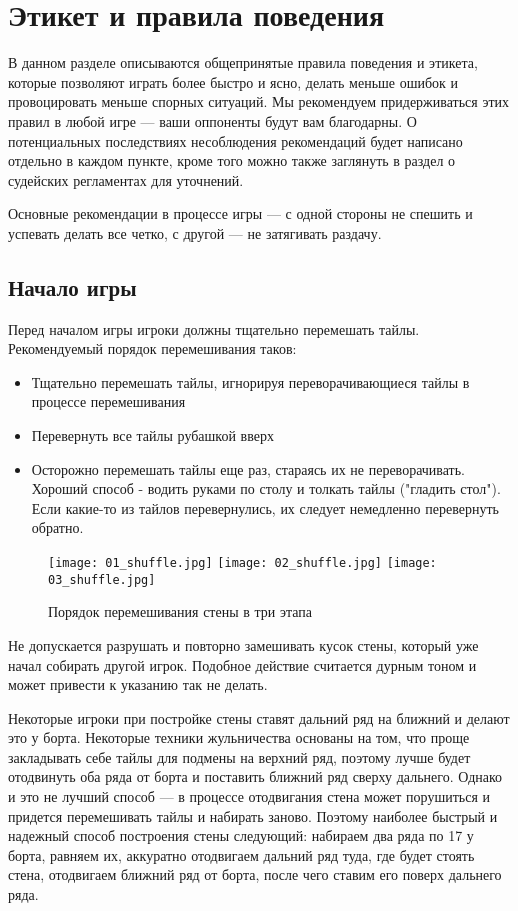 \section{Этикет и правила поведения}

В данном разделе описываются общепринятые правила поведения и этикета, которые позволяют играть более быстро и ясно, делать меньше ошибок и провоцировать меньше спорных ситуаций. Мы рекомендуем придерживаться этих правил в любой игре --- ваши оппоненты будут вам благодарны. О потенциальных последствиях несоблюдения рекомендаций будет написано отдельно в каждом пункте, кроме того можно также заглянуть в раздел о судейских регламентах для уточнений.

Основные рекомендации в процессе игры --- с одной стороны не спешить и успевать делать все четко, с другой --- не затягивать раздачу. 

\subsection {Начало игры}

Перед началом игры игроки должны тщательно перемешать тайлы. Рекомендуемый порядок перемешивания таков:

\begin{itemize}
	\item Тщательно перемешать тайлы, игнорируя переворачивающиеся тайлы в процессе перемешивания
	\item Перевернуть все тайлы рубашкой вверх
	\item Осторожно перемешать тайлы еще раз, стараясь их не переворачивать. Хороший способ - водить руками по столу и толкать тайлы ("гладить стол"). Если какие-то из тайлов перевернулись, их следует немедленно перевернуть обратно.
\end{itemize}

\begin{figure}[H]
	\centering
	\texttt{[image: 01\_shuffle.jpg]}
	\texttt{[image: 02\_shuffle.jpg]}
	\texttt{[image: 03\_shuffle.jpg]}
	\caption{Порядок перемешивания стены в три этапа}
\end{figure}

Не допускается разрушать и повторно замешивать кусок стены, который уже начал собирать другой игрок. Подобное действие считается дурным тоном и может привести к указанию так не делать.

Некоторые игроки при постройке стены ставят дальний ряд на ближний и делают это у борта. Некоторые техники жульничества основаны на том, что проще закладывать себе тайлы для подмены на верхний ряд, поэтому лучше будет отодвинуть оба ряда от борта и поставить ближний ряд сверху дальнего. Однако и это не лучший способ --- в процессе отодвигания стена может порушиться и придется перемешивать тайлы и набирать заново. Поэтому наиболее быстрый и надежный способ построения стены следующий: набираем два ряда по 17 у борта, равняем их, аккуратно отодвигаем дальний ряд туда, где будет стоять стена, отодвигаем ближний ряд от борта, после чего ставим его поверх дальнего ряда. 


